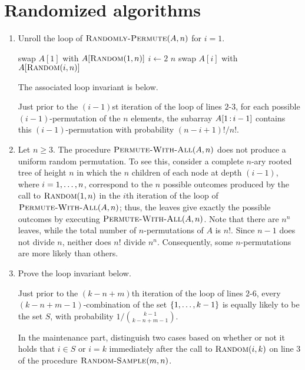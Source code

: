 \setcounter{section}{2}
\section{Randomized algorithms}
\begin{enumerate}[\thesection-1]
%
\item Unroll the \For loop of $\textnormal{\scshape Randomly-Permute}(A, n)$ for $i = 1$.
\begin{codebox}
\li swap $A[1]$ with $A[\textnormal{\scshape Random}(1, n)]$
\li \For $i \gets 2$ \To $n$
\li \Do
        swap $A[i]$ with $A[\textnormal{\scshape Random}(i, n)]$
    \End
\end{codebox}
The associated loop invariant is below.
\begin{loopinv}
Just prior to the $(i - 1)$st iteration of the \For loop of lines $2$-$3$, for each possible $(i - 1)$-permutation of the $n$ elements, the subarray $A[1 \subarr i - 1]$ contains this $(i - 1)$-permutation with probability $(n - i + 1)!/n!$.
\end{loopinv}
%
\setcounter{enumi}{2}
%
\item Let $n \geq 3$. The procedure $\textnormal{\scshape Permute-With-All}(A, n)$ does not produce a uniform random permutation. To see this, consider a complete $n$-ary rooted tree of height $n$ in which the $n$ children of each node at depth $(i - 1)$, where $i = 1, \ldots, n$, correspond to the $n$ possible outcomes produced by the call to $\textnormal{\scshape Random}(1, n)$ in the $i$th iteration of the \For loop of $\textnormal{\scshape Permute-With-All}(A, n)$; thus, the leaves give exactly the possible outcomes by executing $\textnormal{\scshape Permute-With-All}(A, n)$. Note that there are $n^n$ leaves, while the total number of $n$-permutations of $A$ is $n!$. Since $n - 1$ does not divide $n$, neither does $n!$ divide $n^n$. Consequently, some $n$-permutations are more likely than others.
%
\setcounter{enumi}{4}
%
\item Prove the loop invariant below.
\begin{loopinv}
Just prior to the $(k - n + m)$th iteration of the \For loop of lines $2$-$6$, every $(k - n + m - 1)$-combination of the set $\left\{1, \ldots, k - 1\right\}$ is equally likely to be the set $S$, with probability $1/{k - 1 \choose k - n + m - 1}$.
\end{loopinv}
In the maintenance part, distinguish two cases based on whether or not it holds that $i \in S$ or $i = k$ immediately after the call to $\textnormal{\scshape Random}(i, k)$ on line $3$ of the procedure $\textnormal{\scshape Random-Sample}(m, n)$.


\end{enumerate}
